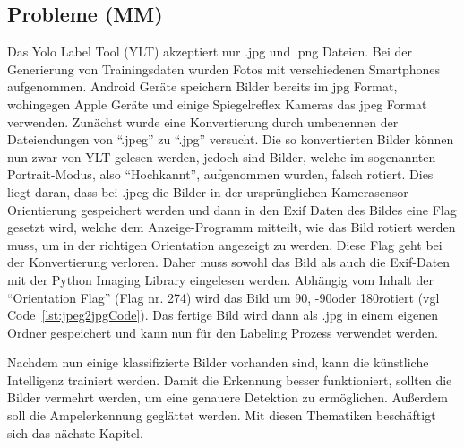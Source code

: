 \documentclass[a4paper,oneside,12pt]{report}
\begin{document}
\begin{onehalfspace}
		\section{Probleme (MM)}
				Das Yolo Label Tool (YLT) akzeptiert nur .jpg und .png Dateien. Bei der Generierung von Trainingsdaten wurden Fotos mit verschiedenen Smartphones aufgenommen. Android Geräte speichern Bilder bereits im jpg Format, wohingegen Apple Geräte und einige Spiegelreflex Kameras das jpeg Format verwenden. Zunächst wurde eine Konvertierung durch umbenennen der Dateiendungen von "`.jpeg"' zu "`.jpg"' versucht. Die so konvertierten Bilder können nun zwar von YLT gelesen werden, jedoch sind Bilder, welche im sogenannten Portrait-Modus, also "`Hochkannt"', aufgenommen wurden, falsch rotiert. Dies liegt daran, dass bei .jpeg die Bilder in der ursprünglichen Kamerasensor Orientierung gespeichert werden und dann in den Exif Daten des Bildes eine Flag gesetzt wird, welche dem Anzeige-Programm mitteilt, wie das Bild rotiert werden muss, um in der richtigen Orientation angezeigt zu werden. Diese Flag geht bei der Konvertierung verloren. Daher muss sowohl das Bild als auch die Exif-Daten mit der Python Imaging Library eingelesen werden. Abhängig vom Inhalt der "`Orientation Flag"' (Flag nr. 274) wird das Bild um 90\degree, -90\degree oder 180\degree rotiert (vgl Code~\ref{lst:jpeg2jpgCode}). Das fertige Bild wird dann als .jpg in einem eigenen Ordner gespeichert und kann nun für den Labeling Prozess verwendet werden.
				
				Nachdem nun einige klassifizierte Bilder vorhanden sind, kann die künstliche Intelligenz trainiert werden. Damit die Erkennung besser funktioniert, sollten die Bilder vermehrt werden, um eine genauere Detektion zu ermöglichen. Außerdem soll die Ampelerkennung geglättet werden. Mit diesen Thematiken beschäftigt sich das nächste Kapitel.
			
	\end{onehalfspace}
\end{document}
